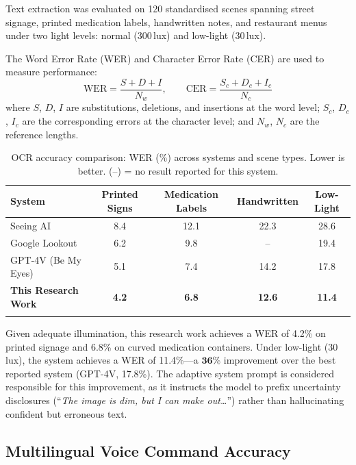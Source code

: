\documentclass[pdflatex,sn-mathphys-num]{sn-jnl}
\theoremstyle{thmstyleone}%
\theoremstyle{thmstyletwo}%
\theoremstyle{thmstylethree}%
\begin{document}
Text extraction was evaluated on 120 standardised scenes spanning street signage,
printed medication labels, handwritten notes, and restaurant menus under two
light levels: normal (300\,lux) and low-light (30\,lux).

The Word Error Rate (WER) and Character Error Rate (CER) are used to measure performance:
\begin{equation}
  \text{WER} = \frac{S + D + I}{N_w}, \qquad
  \text{CER} = \frac{S_c + D_c + I_c}{N_c}
\end{equation}
where $S$, $D$, $I$ are substitutions, deletions, and insertions at the word level;
$S_c$, $D_c$, $I_c$ are the corresponding errors at the character level; and
$N_w$, $N_c$ are the reference lengths.

\begin{table}[htbp]
\caption{OCR accuracy comparison: WER (\%) across systems and scene types.
         Lower is better. (--) = no result reported for this system.}\label{tab:ocr}
\begin{tabular}{@{}lcccc@{}}
\toprule
System & Printed Signs & Medication Labels & Handwritten & Low-Light \\
\midrule
Seeing AI~\cite{microsoftSeeingAI}      & 8.4  & 12.1 & 22.3 & 28.6 \\
Google Lookout~\cite{lookout2020}        & 6.2  & 9.8  & --   & 19.4 \\
GPT-4V (Be My Eyes)~\cite{openai2023gpt4}& 5.1 & 7.4  & 14.2 & 17.8 \\
\textbf{This Research Work}              & \textbf{4.2} & \textbf{6.8} & \textbf{12.6} & \textbf{11.4} \\
\botrule
\end{tabular}
\end{table}

Given adequate illumination, this research work achieves a WER of 4.2\% on printed
signage and 6.8\% on curved medication containers. Under low-light (30\,lux), the
system achieves a WER of 11.4\%---a $\mathbf{36\%}$ improvement over the best
reported system (GPT-4V, 17.8\%). The adaptive system prompt is considered responsible
for this improvement, as it instructs the model to prefix uncertainty disclosures
(``\textit{The image is dim, but I can make out\ldots}'') rather than hallucinating
confident but erroneous text.

\subsection{Multilingual Voice Command Accuracy}
\end{document}
